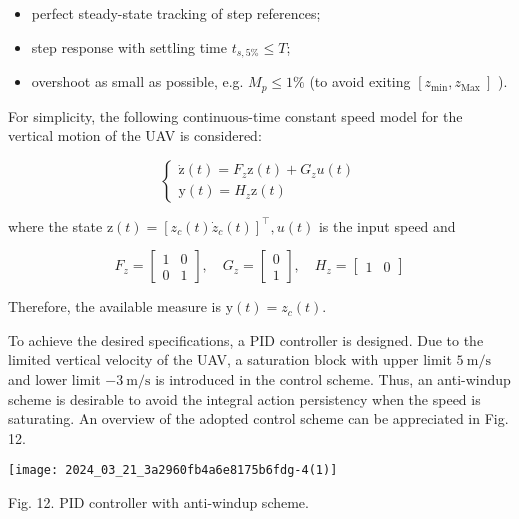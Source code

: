 \documentclass[conference]{IEEEtran}
\begin{document}
\begin{itemize}
  \item perfect steady-state tracking of step references;
  \item step response with settling time $t_{s, 5 \%} \leq T$;
  \item overshoot as small as possible, e.g. $M_{p} \leq 1 \%$ (to avoid exiting $\left[z_{\min }, z_{\text {Max }}\right]$ ).
\end{itemize}

For simplicity, the following continuous-time constant speed model for the vertical motion of the UAV is considered:

\[
\left\{\begin{array}{l}
\dot{\mathrm{z}}(t)=F_{z} \mathrm{z}(t)+G_{z} u(t)  \tag{38}\\
\mathrm{y}(t)=H_{z} \mathrm{z}(t)
\end{array}\right.
\]

where the state $\mathrm{z}(t)=\left[z_{c}(t) \dot{z}_{c}(t)\right]^{\top}, u(t)$ is the input speed and

\[
F_{z}=\left[\begin{array}{ll}
1 & 0  \tag{39}\\
0 & 1
\end{array}\right], \quad G_{z}=\left[\begin{array}{l}
0 \\
1
\end{array}\right], \quad H_{z}=\left[\begin{array}{ll}
1 & 0
\end{array}\right]
\]

Therefore, the available measure is $\mathrm{y}(t)=z_{c}(t)$.

To achieve the desired specifications, a PID controller is designed. Due to the limited vertical velocity of the UAV, a saturation block with upper limit $5 \mathrm{~m} / \mathrm{s}$ and lower limit $-3 \mathrm{~m} / \mathrm{s}$ is introduced in the control scheme. Thus, an anti-windup scheme is desirable to avoid the integral action persistency when the speed is saturating. An overview of the adopted control scheme can be appreciated in Fig. 12.

\begin{center}
\texttt{[image: 2024\_03\_21\_3a2960fb4a6e8175b6fdg-4(1)]}
\end{center}

Fig. 12. PID controller with anti-windup scheme.
\end{document}
